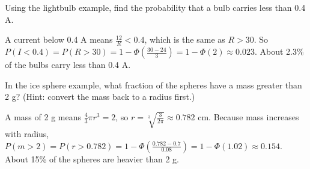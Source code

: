 \begin{Exercise}[label = changevar1]
Using the lightbulb example, find the probability that a bulb carries less than 0.4 A.
\end{Exercise}

\begin{Answer}[ref = changevar1]
A current below 0.4 A means $\frac{12}{R} < 0.4$, which is the same as $R > 30$. So $P(I < 0.4) = P(R > 30) = 1 - \Phi\left(\frac{30 - 24}{3}\right) = 1 - \Phi(2) \approx 0.023$. About 2.3\% of the bulbs carry less than 0.4 A.
\end{Answer} 








\begin{Exercise}[label = changevar2]
In the ice sphere example, what fraction of the spheres have a mass greater than
2 g? (Hint: convert the mass back to a radius first.)
\end{Exercise}

\begin{Answer}[ref = changevar2]
A mass of 2 g means $\frac{4}{3}\pi r^3 = 2$, so $r = \sqrt[3]{\frac{3}{2\pi}} \approx 0.782$ cm.
Because mass increases with radius, $P(m > 2) = P(r > 0.782) = 1 - \Phi\left(\frac{0.782 - 0.7}{0.08}\right) = 1 - \Phi(1.02) \approx 0.154$.
About 15\% of the spheres are heavier than 2 g.
\end{Answer}
